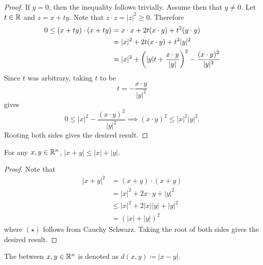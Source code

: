 \documentclass{subfile}
\begin{document}
\begin{proof}
    If $y = 0$, then the inequality follows trivially. Assume then that $y \neq 0$. Let $t \in \mathbb{R}$ and $z = x + ty$. Note that $z \cdot z = |z|^2 \geq 0$. Therefore
    \begin{align*}
        0 \leq (x + ty) \cdot (x + ty) &= x \cdot x + 2 t(x \cdot y) + t^2 (y \cdot y)\\
        &= |x|^2 + 2t(x\cdot y) + t^2 |y|^2 \\
        &= |x|^2 + \qty(|y|t + \frac{x \cdot y}{|y|})^2 - \frac{(x\cdot y)^2}{|y|^2}
    \end{align*}
    Since $t$ was arbitrary, taking $t$ to be
    \[
        t = -\frac{x \cdot y}{|y|^2}
    \]
    gives
    \[
        0 \leq |x|^2 - \frac{(x\cdot y)^2}{|y|^2} \implies (x \cdot y)^2 \leq |x|^2 |y|^2
    .\]
    Rooting both sides gives the desired result.
\end{proof}

\begin{corollary}
    For any $x,y \in \mathbb{R}^n$, $|x+y| \leq |x| + |y|$.
\end{corollary}
\begin{proof}
    Note that 
    \begin{align*}
        |x+y|^2 &= (x + y) \cdot (x + y) \\
        &= |x|^2 + 2 x \cdot y + |y|^2 \\
        &\leq |x|^2 + 2 |x| |y| + |y|^2 \tag{\star} \\
        &= (|x| + |y|)^2
    \end{align*}
    where $(\star)$ follows from Cauchy Schwarz. Taking the root of both sides gives the desired result.
\end{proof}

\begin{definition}
    The  between $x,y \in \mathbb{R}^n$ is denoted as $d(x,y) \coloneq |x-y|$.
\end{definition}
\end{document}
